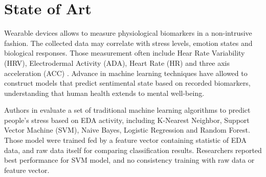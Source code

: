 \section{State of Art}


Wearable devices allows to measure physiological biomarkers in a non-intrusive fashion. The collected data may correlate with stress levels, emotion states and biological responses. Those measurement often include Hear Rate Variability (HRV), Electrodermal Activity (ADA), Heart Rate (HR) and three axis acceleration (ACC) \cite{Vos2023}. Advance in machine learning techniques have allowed to construct models that predict sentimental state based on recorded biomarkers, understanding that human health extends to mental well-being.

Authors in \cite{Zhu2023} evaluate a set of traditional machine learning algorithms to predict people's stress based on EDA activity, including K-Nearest Neighbor, Support Vector Machine (SVM), Naive Bayes, Logistic Regression and Random Forest. Those model were trained fed by a feature vector containing statistic of EDA data, and raw data itself for comparing classification results. Researchers reported best performance for SVM model, and no consistency training with raw data or feature vector.

%



